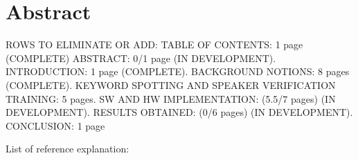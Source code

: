 \chapter*{Abstract} %
\label{abtract}

ROWS TO ELIMINATE OR ADD:\newline\newline
TABLE OF CONTENTS: 1 page (COMPLETE)\newline
ABSTRACT: 0/1 page (IN DEVELOPMENT). INTRODUCTION: 1 page (COMPLETE). BACKGROUND NOTIONS: 8 pages (COMPLETE). KEYWORD SPOTTING AND SPEAKER VERIFICATION TRAINING: 5 pages. SW AND HW IMPLEMENTATION: (5.5/7 pages) (IN DEVELOPMENT). RESULTS OBTAINED: (0/6 pages) (IN DEVELOPMENT). CONCLUSION: 1 page\newline
{} %
List of reference explanation:\newline
